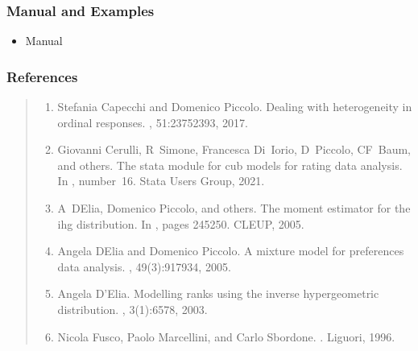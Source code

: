 \documentclass[letterpaper,10pt,english]{sphinxmanual}
\begin{document}
\subsubsection{Manual and Examples}
\label{\detokenize{cubmods:manual-and-examples}}\begin{itemize}
\item {} 
\sphinxAtStartPar
Manual 

\end{itemize}


\subsubsection{References}
\label{\detokenize{cubmods:references}}\begin{quote}
\begin{enumerate}
%
\setcounter{enumi}{0}
\item {} 
\sphinxAtStartPar
Stefania Capecchi and Domenico Piccolo. Dealing with heterogeneity in ordinal responses. , 51:2375\textendash{}2393, 2017.

\item {} 
\sphinxAtStartPar
Giovanni Cerulli, R Simone, Francesca Di Iorio, D Piccolo, CF Baum, and others. The stata module for cub models for rating data analysis. In , number 16. Stata Users Group, 2021.

\item {} 
\sphinxAtStartPar
A D\textquotesingle{}Elia, Domenico Piccolo, and others. The moment estimator for the ihg distribution. In , pages 245\textendash{}250. CLEUP, 2005.

\item {} 
\sphinxAtStartPar
Angela D\textquotesingle{}Elia and Domenico Piccolo. A mixture model for preferences data analysis. , 49(3):917\textendash{}934, 2005.

\item {} 
\sphinxAtStartPar
Angela D’Elia. Modelling ranks using the inverse hypergeometric distribution. , 3(1):65\textendash{}78, 2003.

\item {} 
\sphinxAtStartPar
Nicola Fusco, Paolo Marcellini, and Carlo Sbordone. . Liguori, 1996.


\end{enumerate}
\end{quote}
\end{document}
